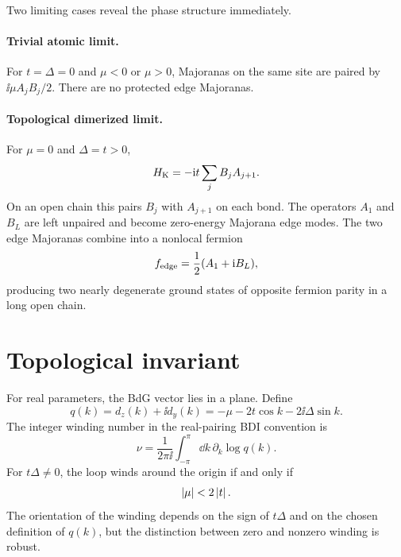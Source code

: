 Two limiting cases reveal the phase structure immediately.

\paragraph{Trivial atomic limit.}
For $t=\Delta=0$ and $\mu<0$ or $\mu>0$, Majoranas on the same site are paired by
$\ii\mu A_jB_j/2$.  There are no protected edge Majoranas.

\paragraph{Topological dimerized limit.}
For $\mu=0$ and $\Delta=t>0$,
\begin{equation}
\label{eq:kitaev-topological-special-point}
    H_{\rm K}
    =
    -\mathrm{i} t\sum_j B_jA_{j+1}.
\end{equation}
On an open chain this pairs $B_j$ with $A_{j+1}$ on each bond.  The operators
$A_1$ and $B_L$ are left unpaired and become zero-energy Majorana edge modes.
The two edge Majoranas combine into a nonlocal fermion
\begin{equation}
\label{eq:kitaev-edge-fermion}
    f_{\rm edge}=\frac{1}{2}(A_1+\mathrm{i} B_L),
\end{equation}
producing two nearly degenerate ground states of opposite fermion parity in a
long open chain.

\section{Topological invariant}
\label{sec:kitaev-topological-invariant}

For real parameters, the BdG vector lies in a plane.  Define
\begin{equation}
\label{eq:kitaev-q-function}
    q(k)
    =
    d_z(k)+\ii d_y(k)
    =
    -\mu-2t\cos k-2\ii\Delta\sin k.
\end{equation}
The integer winding number in the real-pairing BDI convention is
\begin{equation}
\label{eq:kitaev-winding-number}
    \nu
    =
    \frac{1}{2\pi\ii}
    \int_{-\pi}^{\pi}\dd k\,\partial_k\log q(k).
\end{equation}
For $t\Delta\neq0$, the loop winds around the origin if and only if
\begin{equation}
\label{eq:kitaev-topological-condition}
    \left|\mu\right|<2\left|t\right|.
\end{equation}
The orientation of the winding depends on the sign of $t\Delta$ and on the
chosen definition of $q(k)$, but the distinction between zero and nonzero winding
is robust.

